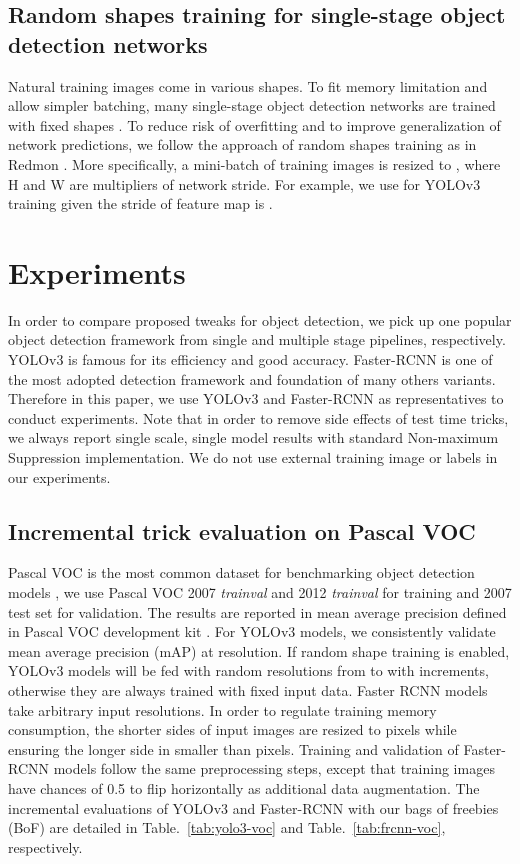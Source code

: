 \documentclass[10pt,twocolumn,letterpaper]{article}
\begin{document}
\subsection{Random shapes training for single-stage object detection networks}

Natural training images come in various shapes. To fit memory limitation and allow simpler batching, many single-stage object detection networks are trained with fixed shapes \cite{liu2016ssd, redmon2016you}. To reduce risk of overfitting and to improve generalization of network predictions, we follow the approach of random shapes training as in Redmon \etal \cite{redmon2018yolov3}. More specifically, a mini-batch of  training images is resized to , where H and W are multipliers of network stride. For example, we use  for YOLOv3 training given the stride of feature map is .


\section{Experiments}
\label{sec:exp}

In order to compare proposed tweaks for object detection, we pick up one popular object detection framework from single and multiple stage pipelines, respectively. YOLOv3 \cite{redmon2018yolov3} is famous for its efficiency and good accuracy. Faster-RCNN \cite{ren2015faster} is one of the most adopted detection framework and foundation of many others variants. Therefore in this paper, we use YOLOv3 and Faster-RCNN as representatives to conduct experiments. Note that in order to remove side effects of test time tricks, we always report single scale, single model results with standard Non-maximum Suppression implementation. We do not use external training image or labels in our experiments.

\subsection{Incremental trick evaluation on Pascal VOC}
Pascal VOC is the most common dataset for benchmarking object detection models \cite{girshick2015fast,liu2016ssd,redmon2016you}, we use Pascal VOC 2007 \textit{trainval} and 2012 \textit{trainval} for training and 2007 test set for validation. The results are reported in mean average precision defined in Pascal VOC development kit \cite{everingham2010pascal}. For YOLOv3 models, we consistently validate mean average precision (mAP) at  resolution. If random shape training is enabled, YOLOv3 models will be fed with random resolutions from  to  with  increments, otherwise they are always trained with fixed  input data. Faster RCNN models take arbitrary input resolutions. In order to regulate training memory consumption, the shorter sides of input images are resized to  pixels while ensuring the longer side in smaller than  pixels. Training and validation of Faster-RCNN models follow the same preprocessing steps, except that training images have chances of 0.5 to flip horizontally as additional data augmentation. The incremental evaluations of YOLOv3 and Faster-RCNN with our bags of freebies (BoF) are detailed in Table.~\ref{tab:yolo3-voc} and Table.~\ref{tab:frcnn-voc}, respectively. 
\end{document}
